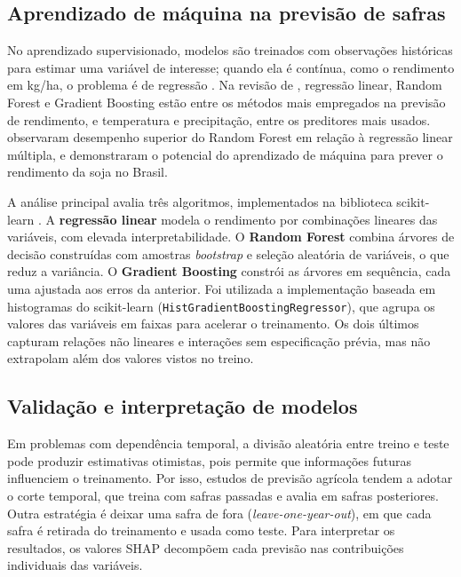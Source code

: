 \documentclass[
	article,			%
	11pt,				%
	oneside,			%
	a4paper,			%
	english,			%
	brazil,				%
	sumario=tradicional
	]{abntex2}
\begin{document}
\subsection{Aprendizado de máquina na previsão de safras}

No aprendizado supervisionado, modelos são treinados com observações históricas para estimar uma variável de interesse; quando ela é contínua, como o rendimento em kg/ha, o problema é de regressão \cite{russell2021}. Na revisão de , regressão linear, Random Forest e Gradient Boosting estão entre os métodos mais empregados na previsão de rendimento, e temperatura e precipitação, entre os preditores mais usados.  observaram desempenho superior do Random Forest em relação à regressão linear múltipla, e  demonstraram o potencial do aprendizado de máquina para prever o rendimento da soja no Brasil.

A análise principal avalia três algoritmos, implementados na biblioteca scikit-learn \cite{pedregosa2011}. A \textbf{regressão linear} modela o rendimento por combinações lineares das variáveis, com elevada interpretabilidade. O \textbf{Random Forest} \cite{breiman2001} combina árvores de decisão construídas com amostras \emph{bootstrap} e seleção aleatória de variáveis, o que reduz a variância. O \textbf{Gradient Boosting} \cite{friedman2001} constrói as árvores em sequência, cada uma ajustada aos erros da anterior. Foi utilizada a implementação baseada em histogramas do scikit-learn (\texttt{HistGradientBoostingRegressor}), que agrupa os valores das variáveis em faixas para acelerar o treinamento. Os dois últimos capturam relações não lineares e interações sem especificação prévia, mas não extrapolam além dos valores vistos no treino.

\subsection{Validação e interpretação de modelos}

Em problemas com dependência temporal, a divisão aleatória entre treino e teste pode produzir estimativas otimistas, pois permite que informações futuras influenciem o treinamento. Por isso, estudos de previsão agrícola tendem a adotar o corte temporal, que treina com safras passadas e avalia em safras posteriores. Outra estratégia é deixar uma safra de fora (\emph{leave-one-year-out}), em que cada safra é retirada do treinamento e usada como teste. Para interpretar os resultados, os valores SHAP \cite{lundberg2017} decompõem cada previsão nas contribuições individuais das variáveis.
\end{document}
